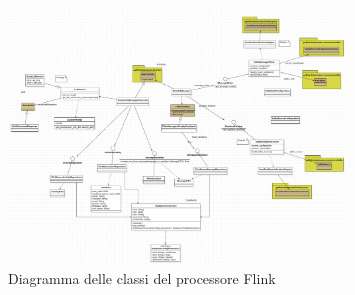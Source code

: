 \documentclass[10pt]{article}
\begin{document}
    \begin{figure}[H]
        \centering
        \includegraphics[width=0.8\textwidth]{diaFlink.png}
        \caption{Diagramma delle classi del processore Flink}
        \label{fig:flink_processor}
    \end{figure}
\end{document}
